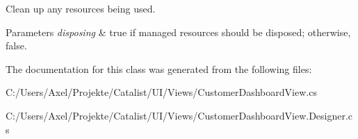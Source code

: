 Clean up any resources being used. 


\begin{DoxyParams}{Parameters}
{\em disposing} & true if managed resources should be disposed; otherwise, false.\\
\hline
\end{DoxyParams}


The documentation for this class was generated from the following files\+:\begin{DoxyCompactItemize}
\item 
C\+:/\+Users/\+Axel/\+Projekte/\+Catalist/\+U\+I/\+Views/Customer\+Dashboard\+View.\+cs\item 
C\+:/\+Users/\+Axel/\+Projekte/\+Catalist/\+U\+I/\+Views/Customer\+Dashboard\+View.\+Designer.\+cs\end{DoxyCompactItemize}

